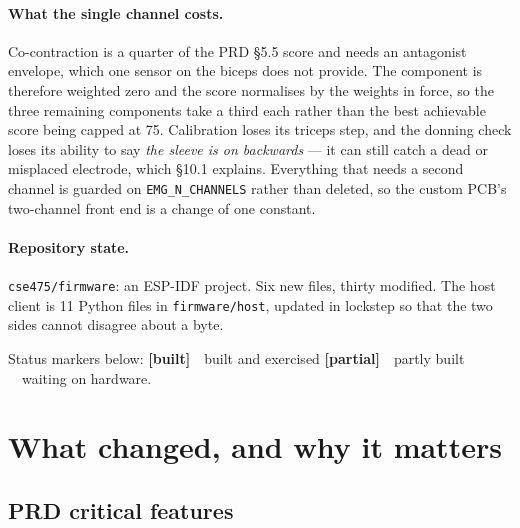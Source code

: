 \documentclass[11pt]{article}
\newcommand{\built}{{\sffamily\scriptsize\color{good}\textbf{[built]}}\ }
\newcommand{\inpart}{{\sffamily\scriptsize\color{marker}\textbf{[partial]}}\ }
\newcommand{\todo}{{\sffamily\scriptsize\color{bad}\textbf{[hardware]}}\ }
\begin{document}
\paragraph{What the single channel costs.} Co-contraction is a quarter of the
PRD \S5.5 score and needs an antagonist envelope, which one sensor on the
biceps does not provide. The component is therefore weighted zero and the
score normalises by the weights in force, so the three remaining components
take a third each rather than the best achievable score being capped at 75.
Calibration loses its triceps step, and the donning check loses its ability to
say \emph{the sleeve is on backwards} --- it can still catch a dead or
misplaced electrode, which \S10.1 explains. Everything that needs a second
channel is guarded on \texttt{EMG\_N\_CHANNELS} rather than deleted, so the
custom PCB's two-channel front end is a change of one constant.

\paragraph{Repository state.} \texttt{cse475/firmware}: an ESP-IDF project.
Six new files, thirty modified. The host client is 11 Python files in
\texttt{firmware/host}, updated in lockstep so that the two sides cannot
disagree about a byte.

\medskip
\noindent
Status markers below: \built\ built and exercised \quad
\inpart\ partly built \quad \todo\ waiting on hardware.

\section{What changed, and why it matters}

\subsection{PRD critical features}
\end{document}
